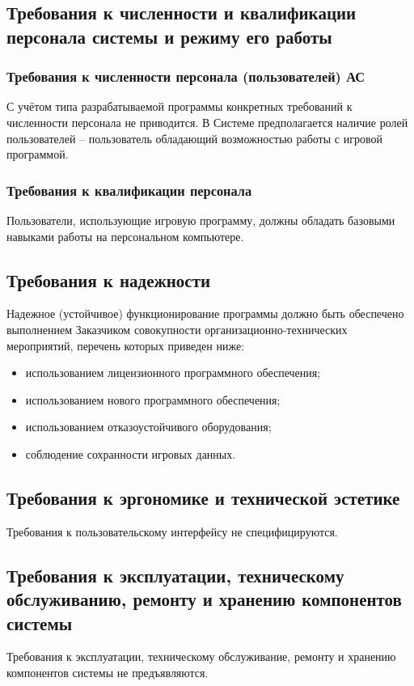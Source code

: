 \subsection{Требования к численности и квалификации персонала системы и режиму его работы}
\subsubsection{Требования к численности персонала (пользователей) АС}
С учётом типа разрабатываемой программы конкретных требований к численности персонала не 
приводится. В Системе предполагается наличие ролей пользователей -- пользователь 
обладающий возможностью работы с игровой программой.

\subsubsection{Требования к квалификации персонала}
Пользователи, использующие игровую программу, должны обладать базовыми навыками работы на 
персональном компьютере.

\subsection{Требования к надежности}
Надежное (устойчивое) функционирование программы должно быть обеспечено выполнением 
Заказчиком совокупности организационно-технических мероприятий, перечень которых приведен 
ниже: 
\begin{itemize}
    \item использованием лицензионного программного обеспечения; 
    \item использованием нового программного обеспечения;
    \item использованием отказоустойчивого оборудования;
    \item соблюдение сохранности игровых данных.
\end{itemize}

\subsection{Требования к эргономике и технической эстетике}
Требования к пользовательскому интерфейсу не специфицируются.

\subsection{Требования к эксплуатации, техническому обслуживанию, ремонту и хранению компонентов 
    системы}
Требования к эксплуатации, техническому обслуживание, ремонту и хранению компонентов системы 
не предъявляются.

